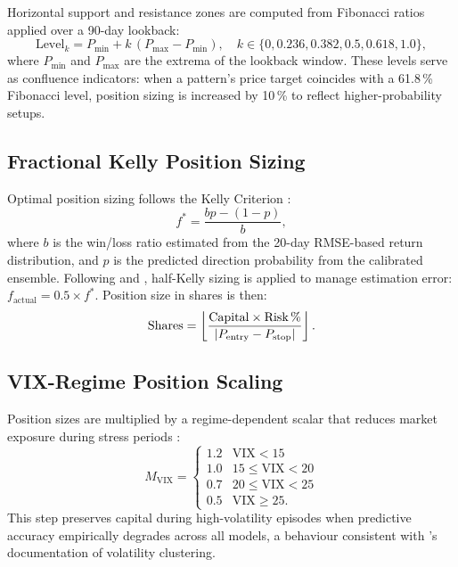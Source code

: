 \documentclass[ASNA,twocolumn]{USG}
\begin{document}
Horizontal support and resistance zones are computed from Fibonacci ratios
applied over a 90-day lookback:
\begin{equation}
  \text{Level}_k = P_{\min} + k\,(P_{\max} - P_{\min}),
  \quad k \in \{0, 0.236, 0.382, 0.5, 0.618, 1.0\},
  \label{eq:fib}
\end{equation}
where $P_{\min}$ and $P_{\max}$ are the extrema of the lookback window.
These levels serve as confluence indicators: when a pattern's price target
coincides with a 61.8\,\% Fibonacci level, position sizing is increased
by 10\,\% to reflect higher-probability setups.

\subsection{Fractional Kelly Position Sizing}

Optimal position sizing follows the Kelly Criterion \citep{kelly1956, maclean2011}:
\begin{equation}
  f^* = \frac{bp - (1-p)}{b},
  \label{eq:kelly}
\end{equation}
where $b$ is the win/loss ratio estimated from the 20-day RMSE-based return
distribution, and $p$ is the predicted direction probability from the
calibrated ensemble. Following \citet{thorp2017} and \citet{vince2009},
half-Kelly sizing is applied to manage estimation error:
$f_\text{actual} = 0.5 \times f^*$.
Position size in shares is then:
\begin{equation}
  \text{Shares} = \left\lfloor
    \frac{\text{Capital} \times \text{Risk\,\%}}{|P_\text{entry} - P_\text{stop}|}
  \right\rfloor.
  \label{eq:shares}
\end{equation}

\subsection{VIX-Regime Position Scaling}

Position sizes are multiplied by a regime-dependent scalar that reduces
market exposure during stress periods \citep{whaley2000, hamilton1989}:
\begin{equation}
  M_\text{VIX} = \begin{cases}
    1.2 & \text{VIX} < 15 \\
    1.0 & 15 \leq \text{VIX} < 20 \\
    0.7 & 20 \leq \text{VIX} < 25 \\
    0.5 & \text{VIX} \geq 25.
  \end{cases}
  \label{eq:vixscale}
\end{equation}
This step preserves capital during high-volatility episodes when predictive
accuracy empirically degrades across all models, a behaviour consistent with
\citet{bollerslev1986}'s documentation of volatility clustering.
\end{document}
